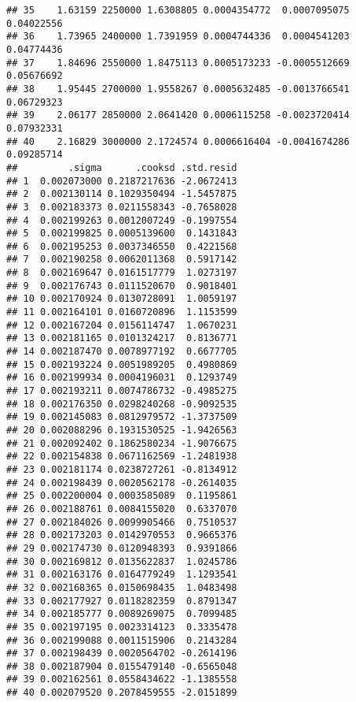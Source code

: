 \documentclass[]{book}
\newenvironment{Shaded}{\begin{snugshade}}{\end{snugshade}}
\newcommand{\DataTypeTok}[1]{\textcolor[rgb]{0.13,0.29,0.53}{#1}}
\newcommand{\FloatTok}[1]{\textcolor[rgb]{0.00,0.00,0.81}{#1}}
\newcommand{\KeywordTok}[1]{\textcolor[rgb]{0.13,0.29,0.53}{\textbf{#1}}}
\newcommand{\NormalTok}[1]{#1}
\newcommand{\OperatorTok}[1]{\textcolor[rgb]{0.81,0.36,0.00}{\textbf{#1}}}
\newcommand{\StringTok}[1]{\textcolor[rgb]{0.31,0.60,0.02}{#1}}
\theoremstyle{definition}
\theoremstyle{definition}
\theoremstyle{definition}
\theoremstyle{remark}
\begin{document}
\begin{verbatim}
## 35    1.63159 2250000 1.6308805 0.0004354772  0.0007095075 0.04022556
## 36    1.73965 2400000 1.7391959 0.0004744336  0.0004541203 0.04774436
## 37    1.84696 2550000 1.8475113 0.0005173233 -0.0005512669 0.05676692
## 38    1.95445 2700000 1.9558267 0.0005632485 -0.0013766541 0.06729323
## 39    2.06177 2850000 2.0641420 0.0006115258 -0.0023720414 0.07932331
## 40    2.16829 3000000 2.1724574 0.0006616404 -0.0041674286 0.09285714
##         .sigma      .cooksd .std.resid
## 1  0.002073000 0.2187217636 -2.0672413
## 2  0.002130114 0.1029350494 -1.5457875
## 3  0.002183373 0.0211558343 -0.7658028
## 4  0.002199263 0.0012007249 -0.1997554
## 5  0.002199825 0.0005139600  0.1431843
## 6  0.002195253 0.0037346550  0.4221568
## 7  0.002190258 0.0062011368  0.5917142
## 8  0.002169647 0.0161517779  1.0273197
## 9  0.002176743 0.0111520670  0.9018401
## 10 0.002170924 0.0130728091  1.0059197
## 11 0.002164101 0.0160720896  1.1153599
## 12 0.002167204 0.0156114747  1.0670231
## 13 0.002181165 0.0101324217  0.8136771
## 14 0.002187470 0.0078977192  0.6677705
## 15 0.002193224 0.0051989205  0.4980869
## 16 0.002199934 0.0004196031  0.1293749
## 17 0.002193211 0.0074786732 -0.4985275
## 18 0.002176350 0.0298240268 -0.9092535
## 19 0.002145083 0.0812979572 -1.3737509
## 20 0.002088296 0.1931530525 -1.9426563
## 21 0.002092402 0.1862580234 -1.9076675
## 22 0.002154838 0.0671162569 -1.2481938
## 23 0.002181174 0.0238727261 -0.8134912
## 24 0.002198439 0.0020562178 -0.2614035
## 25 0.002200004 0.0003585089  0.1195861
## 26 0.002188761 0.0084155020  0.6337070
## 27 0.002184026 0.0099905466  0.7510537
## 28 0.002173203 0.0142970553  0.9665376
## 29 0.002174730 0.0120948393  0.9391866
## 30 0.002169812 0.0135622837  1.0245786
## 31 0.002163176 0.0164779249  1.1293541
## 32 0.002168365 0.0150698435  1.0483498
## 33 0.002177927 0.0118282359  0.8791347
## 34 0.002185777 0.0089269075  0.7099485
## 35 0.002197195 0.0023314123  0.3335478
## 36 0.002199088 0.0011515906  0.2143284
## 37 0.002198439 0.0020564702 -0.2614196
## 38 0.002187904 0.0155479140 -0.6565048
## 39 0.002162561 0.0558434622 -1.1385558
## 40 0.002079520 0.2078459555 -2.0151899
\end{verbatim}

\begin{Shaded}
\end{Shaded}
\end{document}
